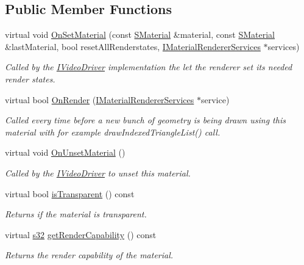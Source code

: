 \subsection*{Public Member Functions}
\begin{DoxyCompactItemize}
\item 
virtual void \hyperlink{classirr_1_1video_1_1IMaterialRenderer_aeaffc03c1b9feb40cd01469726b287e3}{On\+Set\+Material} (const \hyperlink{classirr_1_1video_1_1SMaterial}{S\+Material} \&material, const \hyperlink{classirr_1_1video_1_1SMaterial}{S\+Material} \&last\+Material, bool reset\+All\+Renderstates, \hyperlink{classirr_1_1video_1_1IMaterialRendererServices}{I\+Material\+Renderer\+Services} $\ast$services)
\begin{DoxyCompactList}\small\item\em Called by the \hyperlink{classirr_1_1video_1_1IVideoDriver}{I\+Video\+Driver} implementation the let the renderer set its needed render states. \end{DoxyCompactList}\item 
virtual bool \hyperlink{classirr_1_1video_1_1IMaterialRenderer_acdb3d562cbb7a7d7d83f8cc231ee0421}{On\+Render} (\hyperlink{classirr_1_1video_1_1IMaterialRendererServices}{I\+Material\+Renderer\+Services} $\ast$service)
\begin{DoxyCompactList}\small\item\em Called every time before a new bunch of geometry is being drawn using this material with for example draw\+Indexed\+Triangle\+List() call. \end{DoxyCompactList}\item 
virtual void \hyperlink{classirr_1_1video_1_1IMaterialRenderer_a694b1285671853cb151c03100fd01c73}{On\+Unset\+Material} ()
\begin{DoxyCompactList}\small\item\em Called by the \hyperlink{classirr_1_1video_1_1IVideoDriver}{I\+Video\+Driver} to unset this material. \end{DoxyCompactList}\item 
virtual bool \hyperlink{classirr_1_1video_1_1IMaterialRenderer_a31ba4c2c50b85327d328cb9e7b1764bd}{is\+Transparent} () const 
\begin{DoxyCompactList}\small\item\em Returns if the material is transparent. \end{DoxyCompactList}\item 
virtual \hyperlink{namespaceirr_ac66849b7a6ed16e30ebede579f9b47c6}{s32} \hyperlink{classirr_1_1video_1_1IMaterialRenderer_a8ccaf22f84f26a718559d3c97f7cb550}{get\+Render\+Capability} () const 
\begin{DoxyCompactList}\small\item\em Returns the render capability of the material. \end{DoxyCompactList}\end{DoxyCompactItemize}
